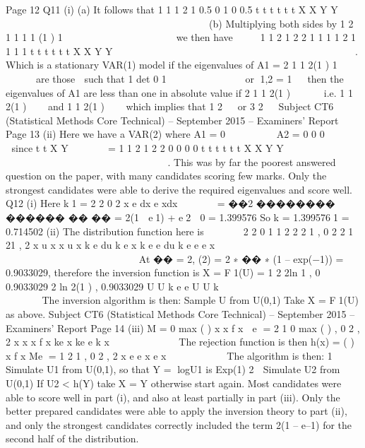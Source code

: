 \documentclass[a4paper,12pt]{article}
\begin{document}
    Page 12
  Q11 (i) (a) It follows that
  1
  1
  1 2
  1 0.5 0
  1 0 0.5
  t t t
  t t t
  X X
  Y Y
  
  
          
                      
  (b) Multiplying both sides by
  1
  2
  1 1 1
  1 (1 ) 1
      
           
  we then have
     
  1
  1
  2 1 2 2
  1 1 1 1
  2 1 1 1 1
  t t t
  t t t
  X X
  Y Y
  
  
         
                       
  
  
  .
  Which is a stationary VAR(1) model if the eigenvalues of
  A1 = 2
  1 1
  2(1 ) 1
   
       
  are those  such that
  1
  det 0
  1
      
        
  or 1,2 = 1  
  then the eigenvalues of A1 are less than one in absolute value if
  2
  1 1
  2(1 )
   
  
   
  i.e.
  1 1
  2(1 )
  
   
  and
  1 1
  2(1 )
  
   
  which implies that 1
  2
    or 3
  2
   
  Subject CT6 (Statistical Methods Core Technical) – September 2015 – Examiners’ Report
  Page 13
  (ii) Here we have a VAR(2) where
  A1 =
    0
   
      
  A2 =
    0 0
  0
   
     
  since
  t
  t
  X
  Y
   
   
   
  =
    1
  1 2
  1 2 2
  0 0
  0 0
  t t t
  t t t
  X X
  Y Y
   
   
         
                      
  
  
  .
  This was by far the poorest answered question on the paper, with many
  candidates scoring few marks. Only the strongest candidates were able to
  derive the required eigenvalues and score well.
  Q12 (i) Here k1 = 2
  2
  0 2
  x
  e dx e xdx
        = ��2 ��������
  ������
  ��
  ��
  = 2(1  e1) + e2  0
  = 1.399576
  So k = 1.3995761 = 0.714502
  (ii) The distribution function here is
       
  2 2
  0
  1 1 2
  2
  2 1 , 0 2
  2 1 21 , 2
  x u x
  x
  u x
  k e du k e x
  k e e du k e e e x
   
      
    
        
        
    
                 
  
  
  At �� = 2, (2) = 2 ∗ �� ∗ (1 – exp(−1)) = 0.9033029, therefore the inversion
  function is
  X = F1(U) =
    1 2
  2ln 1 , 0 0.9033029
  2
  ln 2(1 ) , 0.9033029
  U U
  k
  e e U U
  k
   
             
  
              
  The inversion algorithm is then:
    Sample U from U(0,1)
  Take X = F1(U) as above.
  Subject CT6 (Statistical Methods Core Technical) – September 2015 – Examiners’ Report
  Page 14
  (iii) M =
    0
  max ( ) x x
  f x
   e
  = 2 1
  0
  max ( ) , 0 2
  , 2
  x
  x x
  f x ke x ke
  e k x
  
   
  
     
   
  The rejection function is then
  h(x) = ( )
  x
  f x
  Me =
    1 2
  1
  , 0 2
  , 2
  x
  e e x
  e x
  
  
  
    
    
  The algorithm is then:
    1  Simulate U1 from U(0,1), so that Y = logU1 is Exp(1)
  2  Simulate U2 from U(0,1)
  If U2 < h(Y) take X = Y otherwise start again.
  Most candidates were able to score well in part (i), and also at least partially
  in part (iii). Only the better prepared candidates were able to apply the
  inversion theory to part (ii), and only the strongest candidates correctly
  included the term 2(1 – e–1) for the second half of the distribution.
\end{document}
